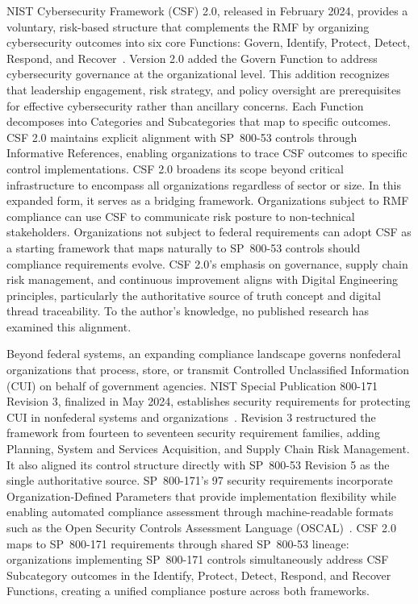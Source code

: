 NIST Cybersecurity Framework (CSF) 2.0, released in February 2024, provides a voluntary, risk-based structure that complements the RMF by organizing cybersecurity outcomes into six core Functions: Govern, Identify, Protect, Detect, Respond, and Recover~\parencite{NIST_CSF_2_0_2024}. Version 2.0 added the Govern Function to address cybersecurity governance at the organizational level. This addition recognizes that leadership engagement, risk strategy, and policy oversight are prerequisites for effective cybersecurity rather than ancillary concerns. Each Function decomposes into Categories and Subcategories that map to specific outcomes. CSF 2.0 maintains explicit alignment with SP~800-53 controls through Informative References, enabling organizations to trace CSF outcomes to specific control implementations. CSF 2.0 broadens its scope beyond critical infrastructure to encompass all organizations regardless of sector or size. In this expanded form, it serves as a bridging framework. Organizations subject to RMF compliance can use CSF to communicate risk posture to non-technical stakeholders. Organizations not subject to federal requirements can adopt CSF as a starting framework that maps naturally to SP~800-53 controls should compliance requirements evolve. CSF 2.0's emphasis on governance, supply chain risk management, and continuous improvement aligns with Digital Engineering principles, particularly the authoritative source of truth concept and digital thread traceability. To the author's knowledge, no published research has examined this alignment.

Beyond federal systems, an expanding compliance landscape governs nonfederal organizations that process, store, or transmit Controlled Unclassified Information (CUI) on behalf of government agencies. NIST Special Publication 800-171 Revision 3, finalized in May 2024, establishes security requirements for protecting CUI in nonfederal systems and organizations~\parencite{NIST_SP_800_171_R3_2024}. Revision 3 restructured the framework from fourteen to seventeen security requirement families, adding Planning, System and Services Acquisition, and Supply Chain Risk Management. It also aligned its control structure directly with SP~800-53 Revision 5 as the single authoritative source. %
SP~800-171's 97 security requirements incorporate Organization-Defined Parameters that provide implementation flexibility while enabling automated compliance assessment through machine-readable formats such as the Open Security Controls Assessment Language (OSCAL)~\parencite{NIST_OSCAL_2023}. CSF 2.0 maps to SP~800-171 requirements through shared SP~800-53 lineage: organizations implementing SP~800-171 controls simultaneously address CSF Subcategory outcomes in the Identify, Protect, Detect, Respond, and Recover Functions, creating a unified compliance posture across both frameworks.

